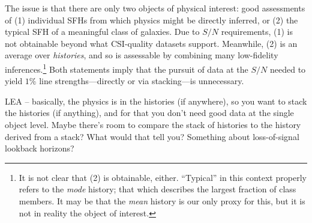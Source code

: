 \documentclass[a4paper,fleqn,usenatbib]{mnras}
\newcommand{\bfr}{\bf\color{red}}
\newcommand{\bfb}{\color{myblue}}
\begin{document}
The issue is that there are only two objects of physical interest: good assessments of (1) individual SFHs 
from which physics might be directly inferred, or  (2) the typical SFH of a meaningful class of galaxies. 
Due to $S/N$ requirements, (1) is not obtainable beyond what CSI-quality datasets support. 
Meanwhile, (2) is an average over {\it histories}, and so is assessable by combining many 
low-fidelity inferences.\footnote{It is
not clear that (2) is obtainable, either. ``Typical'' in this context properly refers to the {\it mode} history; 
that which describes the largest fraction of class members. It may be that the {\it mean} history is our 
only proxy for this, but it is not in reality the object of interest.} Both statements imply that the 
pursuit of data at the $S/N$ needed to yield $1\%$ line strengths---directly or via stacking---is unnecessary. %


{\bfb LEA -- basically,
the physics is in the histories (if anywhere), so you want to stack the histories (if anything), and 
for that you don't need good data at the single object level. Maybe there's room to compare
the stack of histories to the history derived from a stack? What would that tell you? Something
about loss-of-signal lookback horizons?}



\end{document}
